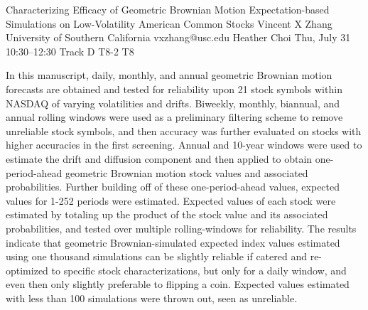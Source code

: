 \begin{talk}
  {Characterizing Efficacy of Geometric Brownian Motion Expectation-based Simulations on Low-Volatility American Common Stocks}%
  {Vincent X Zhang}%
  {University of Southern California}%
  {vxzhang@usc.edu}%
  {Heather Choi}%
  {}%
  {Thu, July 31 10:30–12:30 Track D}%
  {T8-2}%
  {T8}%
  
				
			
In this manuscript, daily, monthly, and annual geometric Brownian motion forecasts are obtained and tested for reliability upon 21 stock symbols within NASDAQ of varying volatilities and drifts. Biweekly, monthly, biannual, and annual rolling windows were used as a preliminary filtering scheme to remove unreliable stock symbols, and then accuracy was further evaluated on stocks with higher accuracies in the first screening. Annual and 10-year windows were used to estimate the drift and diffusion component and then applied to obtain one-period-ahead geometric Brownian motion stock values and associated probabilities. Further building off of these one-period-ahead values, expected values for 1-252 periods were estimated. Expected values of each stock were estimated by totaling up the product of the stock value and its associated probabilities, and tested over multiple rolling-windows for reliability. The results indicate that geometric Brownian-simulated expected index values estimated using one thousand simulations can be slightly reliable if catered and re-optimized to specific stock characterizations, but only for a daily window, and even then only slightly preferable to flipping a coin. Expected values estimated with less than 100 simulations were thrown out, seen as unreliable.


\medskip


\end{talk}
